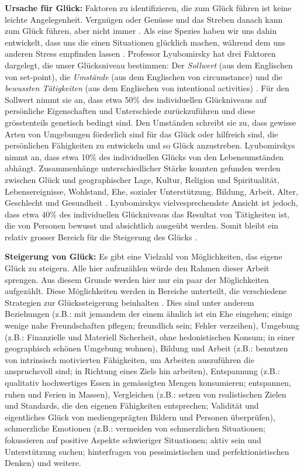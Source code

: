\par
\textbf{Ursache für Glück:}
Faktoren zu identifizieren, die zum Glück führen ist keine leichte Angelegenheit. Vergnügen oder Genüsse und das Streben danach kann zum Glück führen, aber nicht immer \cite{Diener2009, Eid2008}. Als eine Spezies haben wir uns dahin entwickelt, dass uns die einen Situationen glücklich machen, während dem uns anderen Stress empfinden lassen \cite{Carr2011}. Professor Lyubomirsky hat drei Faktoren dargelegt, die unser Glücksniveau bestimmen: Der \textit{Sollwert} (aus dem Englischen von set-point), die \textit{Umstände} (aus dem Englischen von circumstance) und die \textit{bewussten Tätigkeiten} (aus dem Englischen von intentional activities) \cite{Lyubomirsky2008, Lyubomirsky2005}. Für den Sollwert nimmt sie an, dass etwa 50\% des individuellen Glückniveaus auf persönliche Eigenschaften und Unterschiede zurückzuführen und diese grösstenteils genetisch bedingt sind. Den Umständen schreibt sie zu, dass gewisse Arten von Umgebungen förderlich sind für das Glück oder hilfreich sind, die persönlichen Fähigkeiten zu entwickeln und so Glück anzustreben. Lyubomirskys nimmt an, dass etwa 10\% des individuellen Glücks von den Lebensumständen abhängt. Zusammenhänge unterschiedlicher Stärke konnten gefunden werden zwischen Glück und geographischer Lage, Kultur, Religion und Spiritualität, Lebensereignisse, Wohlstand, Ehe, sozialer Unterstützung, Bildung, Arbeit, Alter, Geschlecht und Gesundheit \cite{Carr2011}. Lyubomirskys vielvesprechendste Ansicht ist jedoch, dass etwa 40\% des individuellen Glückniveaus das Resultat von Tätigkeiten ist, die von Personen bewusst und absichtlich ausgeübt werden. Somit bleibt ein relativ grosser Bereich für die Steigerung des Glücks \cite{Lyubomirsky2008}.
\par
\textbf{Steigerung von Glück:} Es gibt eine Vielzahl von Möglichkeiten, das eigene Glück zu steigern. Alle hier aufzuzählen würde den Rahmen dieser Arbeit sprengen. Aus diesem Grunde werden hier nur ein paar der Möglichkeiten aufgezählt. Diese Möglichkeiten werden in Bereiche unterteilt, die verschiedene Strategien zur Glückssteigerung beinhalten \cite{Carr2011}. Dies sind unter anderem Beziehungen (z.B.: mit jemandem der einem ähnlich ist ein Ehe eingehen; einige wenige nahe Freundschaften pflegen; freundlich sein; Fehler verzeihen), Umgebung (z.B.: Finanzielle und Materiell Sicherheit, ohne hedonistischen Konsum; in einer geographisch schönen Umgebung wohnen), Bildung und Arbeit (z.B.: benutzen von intrinsisch motivierten Fähigkeiten, um Arbeiten auszuführen die anspruchsvoll sind; in Richtung eines Ziels hin arbeiten), Entspannung (z.B.: qualitativ hochwertiges Essen in gemässigten Mengen konsumieren; entspannen, ruhen und Ferien in Massen), Vergleichen (z.B.: setzen von realistischen Zielen und Standards, die den eigenen Fähigkeiten entsprechen; Validität und eigentliches Glück von mediengeprägten Bildern und Personen überprüfen), schmerzliche Emotionen (z.B.: vermeiden von schmerzlichen Situationen; fokussieren auf positive Aspekte schwieriger Situationen; aktiv sein und Unterstützung suchen; hinterfragen von pessimistischen und perfektionistischen Denken) und weitere.

